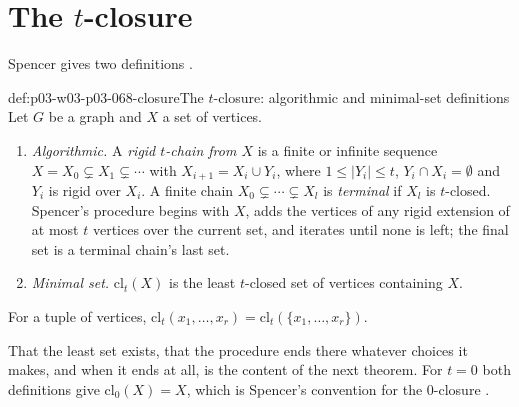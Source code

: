 \section{The \texorpdfstring{\(t\)}{t}-closure}
\label{sec:p03-w03-p03-068-closure-def}

Spencer gives two definitions \cite[p.~8]{Spencer2007LogicRandomStructuresAuthor}.

\begin{hbdefinition}{def:p03-w03-p03-068-closure}{The \(t\)-closure: algorithmic and minimal-set definitions}
Let \(G\) be a graph and \(X\) a set of vertices.
\begin{enumerate}
\item \emph{Algorithmic.}  A \emph{rigid \(t\)-chain from \(X\)} is a
finite or infinite sequence \(X=X_0\subsetneq X_1\subsetneq\cdots\) with
\(X_{i+1}=X_i\cup Y_i\), where \(1\leq|Y_i|\leq t\), \(Y_i\cap
X_i=\emptyset\) and \(Y_i\) is rigid over \(X_i\).  A finite chain
\(X_0\subsetneq\cdots\subsetneq X_l\) is \emph{terminal} if \(X_l\) is
\(t\)-closed.  Spencer's procedure begins with \(X\), adds the vertices of
any rigid extension of at most \(t\) vertices over the current set, and
iterates until none is left; the final set is a terminal chain's last set.
\item \emph{Minimal set.}  \(\mathrm{cl}_t(X)\) is the least \(t\)-closed set
of vertices containing \(X\).
\end{enumerate}
For a tuple of vertices,
\(\mathrm{cl}_t(x_1,\ldots,x_r)=\mathrm{cl}_t(\{x_1,\ldots,x_r\})\).
\end{hbdefinition}

That the least set exists, that the procedure ends there whatever choices
it makes, and when it ends at all, is the content of the next theorem.
For \(t=0\) both definitions give \(\mathrm{cl}_0(X)=X\), which is
Spencer's convention for the \(0\)-closure \cite[p.~9]{Spencer2007LogicRandomStructuresAuthor}.

